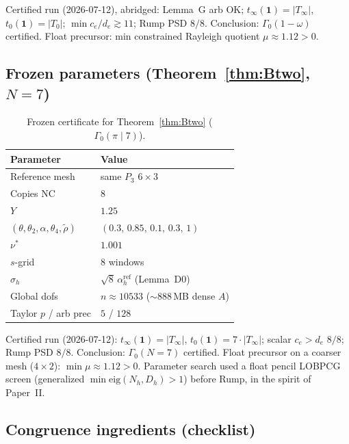 \documentclass[11pt]{amsart}
\begin{document}
Certified run (2026-07-12), abridged: Lemma~G arb OK;
$t_\infty(\mathbf{1})=|T_\infty|$, $t_0(\mathbf{1})=|T_0|$;
$\min c_e/d_e\gtrsim 11$; Rump PSD $8/8$.  Conclusion:
$\Gamma_0(1-\omega)$ certified.  Float precursor: min constrained
Rayleigh quotient $\mu\approx 1.12>0$.

\subsection{Frozen parameters (Theorem~\ref{thm:Btwo}, $N=7$)}

\begin{table}[ht]
\centering
\begin{tabular}{@{}ll@{}}
\toprule
Parameter & Value \\
\midrule
Reference mesh & same $P_3$ $6\times 3$ \\
Copies $\mathrm{NC}$ & $8$ \\
$Y$ & $1.25$ \\
$(\theta,\theta_2,\alpha,\theta_4,\tilde\rho)$
  & $(0.3,\,0.85,\,0.1,\,0.3,\,1)$ \\
$\nu^*$ & $1.001$ \\
$s$-grid & $8$ windows \\
$\sigma_h$ & $\sqrt{8}\,\alpha_h^{\mathrm{ref}}$ (Lemma~D0) \\
Global dofs & $n\approx 10533$ ($\sim 888$\,MB dense $A$) \\
Taylor $p$ / arb prec & $5$ / $128$ \\
\bottomrule
\end{tabular}
\caption{Frozen certificate for Theorem~\ref{thm:Btwo}
($\Gamma_0(\pi\mid 7)$).}
\label{tab:Btwo}
\end{table}

Certified run (2026-07-12): $t_\infty(\mathbf{1})=|T_\infty|$,
$t_0(\mathbf{1})=7\cdot|T_\infty|$; scalar $c_e>d_e$ $8/8$; Rump PSD
$8/8$.  Conclusion: $\Gamma_0(N=7)$ certified.  Float precursor on a
coarser mesh ($4\times 2$): $\min\mu\approx 1.12>0$.  Parameter search
used a float pencil LOBPCG screen (generalized $\min\mathrm{eig}(N_h,D_h)>1$)
before Rump, in the spirit of Paper~II.

\subsection{Congruence ingredients (checklist)}
\end{document}
